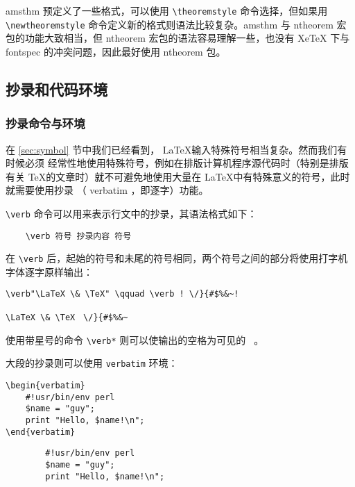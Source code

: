 amsthm 预定义了一些格式，可以使用 \verb|\theoremstyle| 命令选择，但如果用
\verb|\newtheoremstyle| 命令定义新的格式则语法比较复杂。amsthm 与 ntheorem 宏包的功能大致相当，但 ntheorem 宏包的语法容易理解一些，也没有 XeTeX 下与 fontspec 的冲突问题，因此最好使用 ntheorem 包。

\subsection{抄录和代码环境}

\subsubsection{抄录命令与环境}

在 \ref{sec:symbol} 节中我们已经看到， \LaTeX 输入特殊符号相当复杂。然而我们有时候必须
经常性地使用特殊符号，例如在排版计算机程序源代码时（特别是排版有关 \TeX 的文章时）就不可避免地使用大量在 \LaTeX 中有特殊意义的符号，此时就需要使用抄录 （ verbatim ，即逐字）功能。

\verb|\verb| 命令可以用来表示行文中的抄录，其语法格式如下：
\begin{lstlisting}
    \verb 符号 抄录内容 符号
\end{lstlisting}

在 \verb |\verb| 后，起始的符号和未尾的符号相同，两个符号之间的部分将使用打字机字体逐字原样输出：

\begin{minipage}[t]{0.45\textwidth}
\begin{lstlisting}
\verb"\LaTeX \& \TeX" \qquad \verb ! \/}{#$%&~!
\end{lstlisting}
\end{minipage}
\hfill
\begin{minipage}[t]{0.45\textwidth}
\verb"\LaTeX \& \TeX" \qquad \verb ! \/}{#$%
\end{minipage}

使用带星号的命令 \verb|\verb*| 则可以使输出的空格为可见的 \verb*| |。

大段的抄录则可以使用 \verb|verbatim| 环境：

\begin{minipage}[t]{0.45\textwidth}
\begin{lstlisting}
\begin{verbatim}
    #!usr/bin/env perl
    $name = "guy";
    print "Hello, $name!\n";
\end{verbatim}
\end{lstlisting}
\end{minipage}
\hfill
\begin{minipage}[t]{0.45\textwidth}
    \begin{verbatim}
        #!usr/bin/env perl
        $name = "guy";
        print "Hello, $name!\n";
    \end{verbatim}
\end{minipage}


